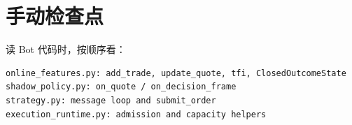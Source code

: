 
\section{手动检查点}

读 Bot 代码时，按顺序看：

\begin{lstlisting}
online_features.py: add_trade, update_quote, tfi, ClosedOutcomeState
shadow_policy.py: on_quote / on_decision_frame
strategy.py: message loop and submit_order
execution_runtime.py: admission and capacity helpers
\end{lstlisting}

